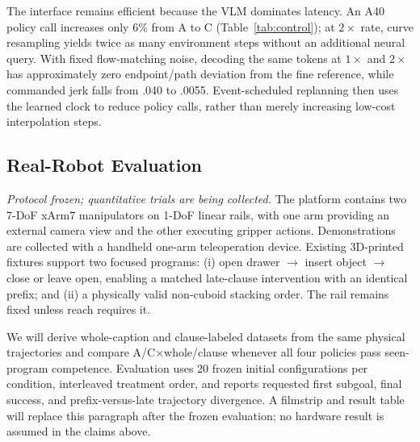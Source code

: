 The interface remains efficient because the VLM dominates latency. An A40 policy call increases only 6\% from A to C (Table~\ref{tab:control}); at $2\times$ rate, curve resampling yields twice as many environment steps without an additional neural query. With fixed flow-matching noise, decoding the same tokens at $1\times$ and $2\times$ has approximately zero endpoint/path deviation from the fine reference, while commanded jerk falls from .040 to .0055. Event-scheduled replanning then uses the learned clock to reduce policy calls, rather than merely increasing low-cost interpolation steps.

\subsection{Real-Robot Evaluation}
\label{sec:hardware}

\textit{Protocol frozen; quantitative trials are being collected.} The platform contains two 7-DoF xArm7 manipulators on 1-DoF linear rails, with one arm providing an external camera view and the other executing gripper actions. Demonstrations are collected with a handheld one-arm teleoperation device. Existing 3D-printed fixtures support two focused programs: (i) open drawer $\rightarrow$ insert object $\rightarrow$ close or leave open, enabling a matched late-clause intervention with an identical prefix; and (ii) a physically valid non-cuboid stacking order. The rail remains fixed unless reach requires it.

We will derive whole-caption and clause-labeled datasets from the same physical trajectories and compare A/C$\times$whole/clause whenever all four policies pass seen-program competence. Evaluation uses 20 frozen initial configurations per condition, interleaved treatment order, and reports requested first subgoal, final success, and prefix-versus-late trajectory divergence. A filmstrip and result table will replace this paragraph after the frozen evaluation; no hardware result is assumed in the claims above.
